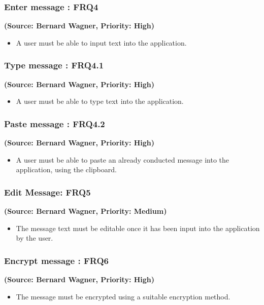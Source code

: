 \subsubsection{Enter message : FRQ4}%
\textbf{(Source: Bernard Wagner, Priority: High)}
\begin{itemize}
\item A user must be able to input text into the application.
\end{itemize}
\subsubsection{Type message : FRQ4.1}
\textbf{(Source: Bernard Wagner, Priority: High)}
\begin{itemize}
\item A user must be able to type text into the application.
\end{itemize}
\subsubsection{Paste message : FRQ4.2}
\textbf{(Source: Bernard Wagner, Priority: High)}
\begin{itemize}
\item A user must be able to paste an already conducted message into the application, using the clipboard.
\end{itemize}
\subsubsection{Edit Message: FRQ5}
\textbf{(Source: Bernard Wagner, Priority: Medium)}
\begin{itemize}
\item The message text must be editable once it has been input into the application by the user.
\end{itemize}
\subsubsection{Encrypt message : FRQ6}
\textbf{(Source: Bernard Wagner, Priority: High)}
\begin{itemize}
\item The message must be encrypted using a suitable encryption method.
\end{itemize}
